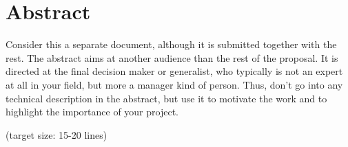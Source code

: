   \newpage
  \section*{Abstract}
  
  Consider this a separate document, although it is submitted together
  with the rest. The abstract aims at another audience than the rest
  of the proposal. It is directed at the final decision maker or
  generalist, who typically is not an expert at all in your field, but
  more a manager kind of person. Thus, don't go into any technical
  description in the abstract, but use it to motivate the work and to
  highlight the importance of your project.

  (target size: 15-20 lines)